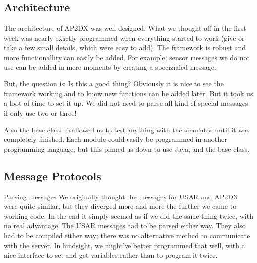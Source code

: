 \subsection{Architecture}
The architecture of AP2DX was well designed. What we thought off in the first week
was nearly exactly programmed when everything started to work (give or take a few
small details, which were easy to add). The framework is robust and more functionallity
can easily be added. For example; sensor messages we do not use can be added in mere moments 
by creating a specizialed message. 

But, the question is: Is this a good thing? Obviously it is nice to see the framework working
and to know new functions can be added later. But it took us a loot of time to set it up. We 
did not need to parse all kind of special messages if only use two or three! 

Also the base class disallowed us to test anything with the simulator until it was completely 
finished. Each module could easily be programmed in another programming language, but this
pinned us down to use Java, and the base class. 

\subsection{Message Protocols}
Parsing messages 
We originally thought the messages for USAR and AP2DX were quite similar, but they diverged more
and more the further we came to working code. In the end it simply seemed as if we did the same
thing twice, with no real advantage. The USAR messages had to be parsed either way. They also
had to be compiled either way; there was no alternative method to communicate with the server. 
In hindsight, we might've better programmed that well, with a nice interface to set and get
variables rather than to program it twice. 

